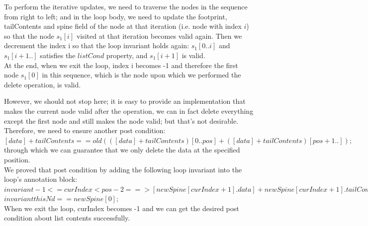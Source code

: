 To perform the iterative updates, we need to traverse the nodes in the sequence from right to left; and in the loop body, we need to update the footprint, tailContents and spine field of the node at that iteration (i.e. node with index $i$) so that the node $s_1[i]$ visited at that iteration becomes valid again. Then we decrement the index i so that 
the loop invariant holds again: $s_1[0..i]$ and  $s_1[i+1..]$ satisfies the  $listCond$ property, and $s_1[i+1]$ is valid.\\

At the end, when we exit the loop, index i becomes -1 and therefore the first node $s_1[0]$ in this sequence, which is the node upon which we performed the delete operation, is valid.

\bigskip

However, we should not stop here; it is easy to provide an implementation that makes the current node valid after the operation, we can in fact delete everything except the first node and still makes the node valid; but that's not desirable.
Therefore, we need to ensure another post condition: $[data] + tailContents == old(([data] + tailContents)[0..pos] + ([data] + tailContents)[pos+1..] );$ through which we can guarantee that we only delete the data at the specified position.\\

We proved that post condition by adding the following loop invariant into the loop's annotation block:\\

$invariant -1 <= curIndex < pos - 2 ==>  [newSpine[curIndex+1].data] + newSpine[curIndex+1].tailContents == oldContents[curIndex+1..pos] + oldContents[pos+1..];$\\

$	invariant thisNd == newSpine[0];$\\

When we exit the loop, curIndex becomes -1 and we can get the desired post condition about list contents successfully.

